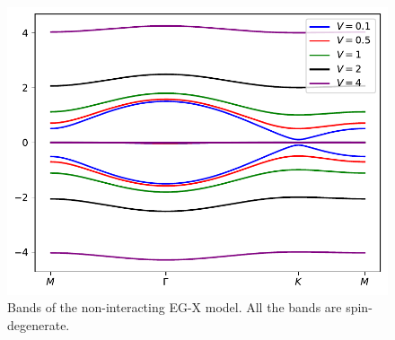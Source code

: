 \begin{figure}[t]
    \centering
    \includegraphics[width=\textwidth]{notes/images/EG_X bands}
    \caption{Bands of the non-interacting EG-X model. All the bands are spin-degenerate.}
    \label{fig:EG-X model non-interacting bands}
\end{figure}


